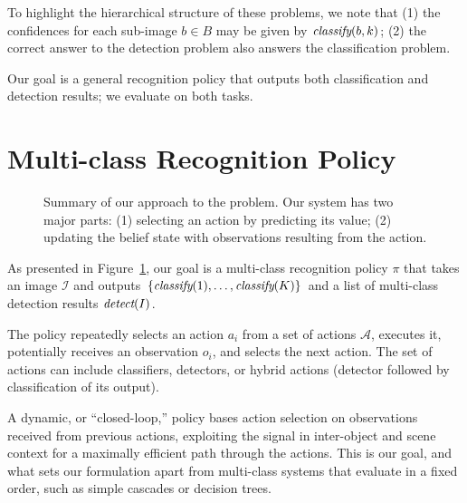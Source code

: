 To highlight the hierarchical structure of these problems, we note that (1) the confidences for each sub-image $b \in B$ may be given by $\emph{classify}(b,k)$; (2) the correct answer to the detection problem also answers the classification problem. 

Our goal is a general recognition policy that outputs both classification and detection results; we evaluate on both tasks.

\section{Multi-class Recognition Policy} \label{sec:tech}
\begin{figure}[h!]
  \caption{Summary of our approach to the problem. Our system has two major parts: (1) selecting an action by predicting its value; (2) updating the belief state with observations resulting from the action.}
  \label{fig:pomdp}
\end{figure}

As presented in Figure~\ref{fig:pomdp}, our goal is a multi-class recognition policy $\pi$ that takes an image $\mathcal{I}$ and outputs $\{\emph{classify}(1), \dots, \emph{classify}(K)\}$ and a list of multi-class detection results $\emph{detect}(I)$.

The policy repeatedly selects an action $a_i$ from a set of actions $\mathcal{A}$, executes it, potentially receives an observation $o_i$, and selects the next action.
The set of actions can include classifiers, detectors, or hybrid actions (detector followed by classification of its output).

A dynamic, or ``closed-loop,'' policy bases action selection on observations received from previous actions, exploiting the signal in inter-object and scene context for a maximally efficient path through the actions.
This is our goal, and what sets our formulation apart from multi-class systems that evaluate in a fixed order, such as simple cascades \cite{Viola2001} or decision trees.

